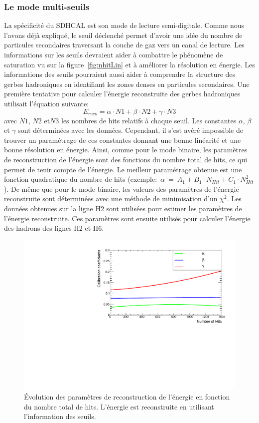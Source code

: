 \subsubsection{Le mode multi-seuils}
La spécificité du SDHCAL est son mode de lecture semi-digitale. Comme nous l'avons déjà expliqué, le seuil déclenché permet d'avoir une idée du nombre de particules secondaires traversant la couche de gaz vers un canal de lecture. Les informations sur les seuils devraient aider à combattre le phénomène de saturation vu sur la figure~\ref{fig:nhitLin} et à améliorer la résolution en énergie. Les informations des seuils pourraient aussi aider à comprendre la structure des gerbes hadroniques en identifiant les zones denses en particules secondaires. Une première tentative pour calculer l'énergie reconstruite des gerbes hadroniques utilisait l'équation suivante:
\begin{equation}
  E_{reco}=\alpha\cdot N1+\beta\cdot N2+\gamma\cdot N3
  \label{eq.erec}
\end{equation}
avec $N1$, $N2$ et$N3$ les nombres de hits relatifs à chaque seuil. Les constantes $\alpha$, $\beta$ et $\gamma$ sont déterminées avec les données. Cependant, il s'est avéré impossible de trouver un paramétrage de ces constantes donnant une bonne linéarité et une bonne résolution en énergie. Ainsi, comme pour le mode binaire, les paramètres de reconstruction de l'énergie sont des fonctions du nombre total de hits, ce qui permet de tenir compte de l'énergie. Le meilleur paramétrage obtenue est une fonction quadratique du nombre de hits (exemple:~$\alpha~=~A_1+B_1\cdot N_{Hit}+C_1\cdot N_{Hit}^2$). De même que pour le mode binaire, les valeurs des paramètres de l'énergie reconstruite sont déterminées avec une méthode de minimisation d'un $\chi^2$. Les données obtenues sur la ligne H2 sont utilisées pour estimer les paramètres de l'énergie reconstruite. Ces paramètres sont ensuite utilisés pour calculer l'énergie des hadrons des lignes H2 et H6.
\begin{figure}[!ht]
  \begin{center}
    \includegraphics[width=.7\textwidth]{SDHCAL/figs/evolution.pdf}
    \caption{Évolution des paramètres de reconstruction de l'énergie en fonction du nombre total de hits. L'énergie est reconstruite en utilisant l'information des seuils.}
    \label{fig:evol}
  \end{center}
\end{figure}
